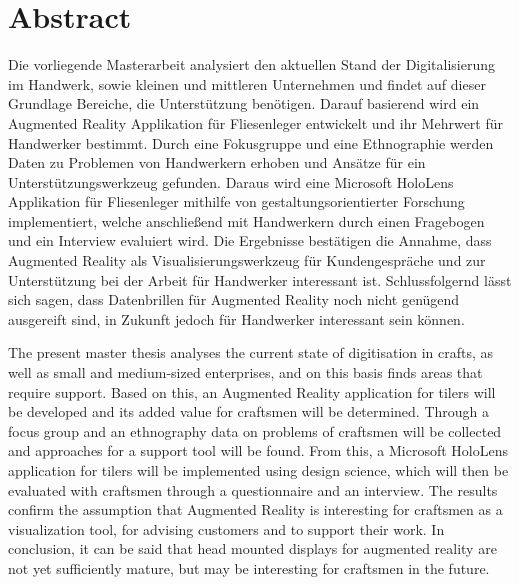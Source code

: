 \chapter*{Abstract}

Die vorliegende Masterarbeit analysiert den aktuellen Stand der Digitalisierung im Handwerk, sowie kleinen und mittleren Unternehmen und findet auf dieser Grundlage Bereiche, die Unterstützung benötigen. Darauf basierend wird ein Augmented Reality Applikation für Fliesenleger entwickelt und ihr Mehrwert für Handwerker bestimmt. Durch eine Fokusgruppe und eine Ethnographie werden Daten zu Problemen von Handwerkern erhoben und Ansätze für ein Unterstützungswerkzeug gefunden. Daraus wird eine Microsoft HoloLens Applikation für Fliesenleger mithilfe von gestaltungsorientierter Forschung implementiert, welche anschließend mit Handwerkern durch einen Fragebogen und ein Interview evaluiert wird. Die Ergebnisse bestätigen die Annahme, dass Augmented Reality als Visualisierungswerkzeug für Kundengespräche und zur Unterstützung bei der Arbeit für Handwerker interessant ist. Schlussfolgernd lässt sich sagen, dass Datenbrillen für Augmented Reality noch nicht genügend ausgereift sind, in Zukunft jedoch für Handwerker interessant sein können.

The present master thesis analyses the current state of digitisation in crafts, as well as small and medium-sized enterprises, and on this basis finds areas that require support. Based on this, an Augmented Reality application for tilers will be developed and its added value for craftsmen will be determined. Through a focus group and an ethnography data on problems of craftsmen will be collected and approaches for a support tool will be found. From this, a Microsoft HoloLens application for tilers will be implemented using design science, which will then be evaluated with craftsmen through a questionnaire and an interview. The results confirm the assumption that Augmented Reality is interesting for craftsmen as a visualization tool, for advising customers and to support their work. In conclusion, it can be said that head mounted displays for augmented reality are not yet sufficiently mature, but may be interesting for craftsmen in the future.
